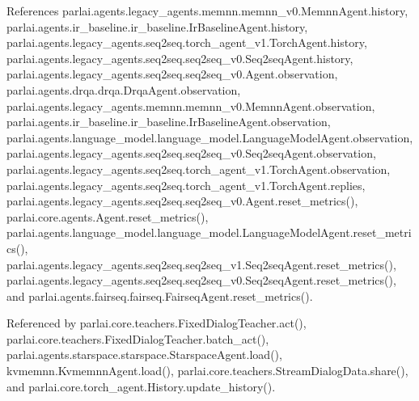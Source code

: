 References parlai.\+agents.\+legacy\+\_\+agents.\+memnn.\+memnn\+\_\+v0.\+Memnn\+Agent.\+history, parlai.\+agents.\+ir\+\_\+baseline.\+ir\+\_\+baseline.\+Ir\+Baseline\+Agent.\+history, parlai.\+agents.\+legacy\+\_\+agents.\+seq2seq.\+torch\+\_\+agent\+\_\+v1.\+Torch\+Agent.\+history, parlai.\+agents.\+legacy\+\_\+agents.\+seq2seq.\+seq2seq\+\_\+v0.\+Seq2seq\+Agent.\+history, parlai.\+agents.\+legacy\+\_\+agents.\+seq2seq.\+seq2seq\+\_\+v0.\+Agent.\+observation, parlai.\+agents.\+drqa.\+drqa.\+Drqa\+Agent.\+observation, parlai.\+agents.\+legacy\+\_\+agents.\+memnn.\+memnn\+\_\+v0.\+Memnn\+Agent.\+observation, parlai.\+agents.\+ir\+\_\+baseline.\+ir\+\_\+baseline.\+Ir\+Baseline\+Agent.\+observation, parlai.\+agents.\+language\+\_\+model.\+language\+\_\+model.\+Language\+Model\+Agent.\+observation, parlai.\+agents.\+legacy\+\_\+agents.\+seq2seq.\+seq2seq\+\_\+v0.\+Seq2seq\+Agent.\+observation, parlai.\+agents.\+legacy\+\_\+agents.\+seq2seq.\+torch\+\_\+agent\+\_\+v1.\+Torch\+Agent.\+observation, parlai.\+agents.\+legacy\+\_\+agents.\+seq2seq.\+torch\+\_\+agent\+\_\+v1.\+Torch\+Agent.\+replies, parlai.\+agents.\+legacy\+\_\+agents.\+seq2seq.\+seq2seq\+\_\+v0.\+Agent.\+reset\+\_\+metrics(), parlai.\+core.\+agents.\+Agent.\+reset\+\_\+metrics(), parlai.\+agents.\+language\+\_\+model.\+language\+\_\+model.\+Language\+Model\+Agent.\+reset\+\_\+metrics(), parlai.\+agents.\+legacy\+\_\+agents.\+seq2seq.\+seq2seq\+\_\+v1.\+Seq2seq\+Agent.\+reset\+\_\+metrics(), parlai.\+agents.\+legacy\+\_\+agents.\+seq2seq.\+seq2seq\+\_\+v0.\+Seq2seq\+Agent.\+reset\+\_\+metrics(), and parlai.\+agents.\+fairseq.\+fairseq.\+Fairseq\+Agent.\+reset\+\_\+metrics().



Referenced by parlai.\+core.\+teachers.\+Fixed\+Dialog\+Teacher.\+act(), parlai.\+core.\+teachers.\+Fixed\+Dialog\+Teacher.\+batch\+\_\+act(), parlai.\+agents.\+starspace.\+starspace.\+Starspace\+Agent.\+load(), kvmemnn.\+Kvmemnn\+Agent.\+load(), parlai.\+core.\+teachers.\+Stream\+Dialog\+Data.\+share(), and parlai.\+core.\+torch\+\_\+agent.\+History.\+update\+\_\+history().

